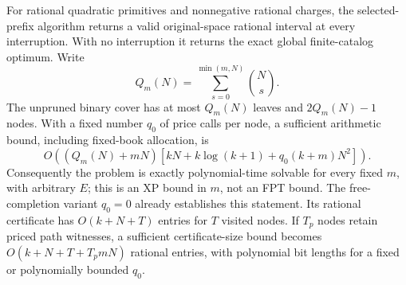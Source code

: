\begin{theorem}\label{thm:r51-tree}
For rational quadratic primitives and nonnegative rational charges, the selected-prefix algorithm returns a valid original-space rational interval at every interruption. With no interruption it returns the exact global finite-catalog optimum. Write
\begin{equation}\label{eq:r51-book-count}
 Q_m(N)=\sum_{s=0}^{\min(m,N)}\binom Ns.
\end{equation}
The unpruned binary cover has at most $Q_m(N)$ leaves and $2Q_m(N)-1$ nodes. With a fixed number $q_0$ of price calls per node, a sufficient arithmetic bound, including fixed-book allocation, is
\begin{equation}\label{eq:r51-tree-cost}
 O\!\left((Q_m(N)+mN)
 [kN+k\log(k+1)+q_0(k+m)N^2]\right).
\end{equation}
Consequently the problem is exactly polynomial-time solvable for every fixed $m$, with arbitrary $E$; this is an XP bound in $m$, not an FPT bound. The free-completion variant $q_0=0$ already establishes this statement. Its rational certificate has $O(k+N+T)$ entries for $T$ visited nodes. If $T_p$ nodes retain priced path witnesses, a sufficient certificate-size bound becomes $O(k+N+T+T_pmN)$ rational entries, with polynomial bit lengths for a fixed or polynomially bounded $q_0$.
\end{theorem}
